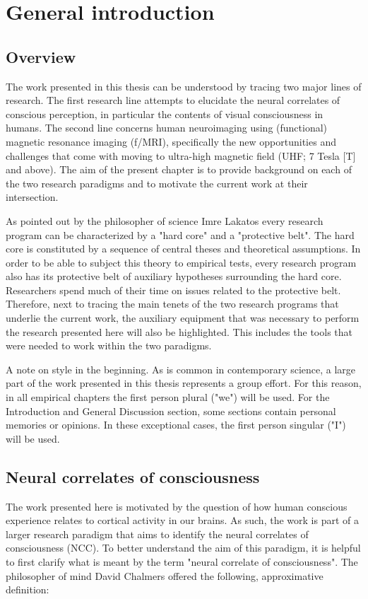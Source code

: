 \chapter{General introduction}
\label{ch:chapter01}
\clearpage{\thispagestyle{empty}\cleardoublepage}

\section{Overview}
The work presented in this thesis can be understood by tracing two major lines of research. The first research line attempts to elucidate the neural correlates of conscious perception, in particular the contents of visual consciousness in humans. The second line concerns human neuroimaging using (functional) magnetic resonance imaging (f/MRI), specifically the new opportunities and challenges that come with moving to ultra-high magnetic field (UHF; 7 Tesla [T] and above). The aim of the present chapter is to provide background on each of the two research paradigms and to motivate the current work at their intersection.

As pointed out by the philosopher of science Imre Lakatos \parencite*{Lakatos1970} every research program can be characterized by a "hard core" and a "protective belt". The hard core is constituted by a sequence of central theses and theoretical assumptions. In order to be able to subject this theory to empirical tests, every research program also has its protective belt of auxiliary hypotheses surrounding the hard core. Researchers spend much of their time on issues related to the protective belt. Therefore, next to tracing the main tenets of the two research programs that underlie the current work, the auxiliary equipment that was necessary to perform the research presented here will also be highlighted. This includes the tools that were needed to work within the two paradigms.

A note on style in the beginning. As is common in contemporary science, a large part of the work presented in this thesis represents a group effort. For this reason, in all empirical chapters the first person plural ("we") will be used. For the Introduction and General Discussion section, some sections contain personal memories or opinions. In these exceptional cases, the first person singular ("I") will be used.

\section{Neural correlates of consciousness}
The work presented here is motivated by the question of how human conscious experience relates to cortical activity in our brains. As such, the work is part of a larger research paradigm that aims to identify the neural correlates of consciousness (NCC). To better understand the aim of this paradigm, it is helpful to first clarify what is meant by the term "neural correlate of consciousness". The philosopher of mind David Chalmers \parencite*{Chalmers2000} offered the following, approximative definition:

